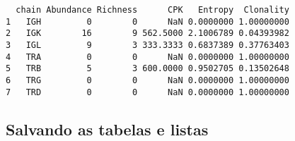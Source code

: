 \documentclass[
  letterpaper,
  DIV=11,
  numbers=noendperiod]{scrartcl}
\newenvironment{Shaded}{\begin{snugshade}}{\end{snugshade}}
\newcommand{\AttributeTok}[1]{\textcolor[rgb]{0.40,0.45,0.13}{#1}}
\newcommand{\DecValTok}[1]{\textcolor[rgb]{0.68,0.00,0.00}{#1}}
\newcommand{\FunctionTok}[1]{\textcolor[rgb]{0.28,0.35,0.67}{#1}}
\newcommand{\NormalTok}[1]{\textcolor[rgb]{0.00,0.23,0.31}{#1}}
\newcommand{\OtherTok}[1]{\textcolor[rgb]{0.00,0.23,0.31}{#1}}
\newcommand{\SpecialCharTok}[1]{\textcolor[rgb]{0.37,0.37,0.37}{#1}}
\newcommand{\StringTok}[1]{\textcolor[rgb]{0.13,0.47,0.30}{#1}}
\begin{document}
\begin{Shaded}
\end{Shaded}

\begin{verbatim}
  chain Abundance Richness      CPK   Entropy  Clonality
1   IGH         0        0      NaN 0.0000000 1.00000000
2   IGK        16        9 562.5000 2.1006789 0.04393982
3   IGL         9        3 333.3333 0.6837389 0.37763403
4   TRA         0        0      NaN 0.0000000 1.00000000
5   TRB         5        3 600.0000 0.9502705 0.13502648
6   TRG         0        0      NaN 0.0000000 1.00000000
7   TRD         0        0      NaN 0.0000000 1.00000000
\end{verbatim}

\hypertarget{salvando-as-tabelas-e-listas}{%
\subsection{Salvando as tabelas e
listas}\label{salvando-as-tabelas-e-listas}}
\end{document}
